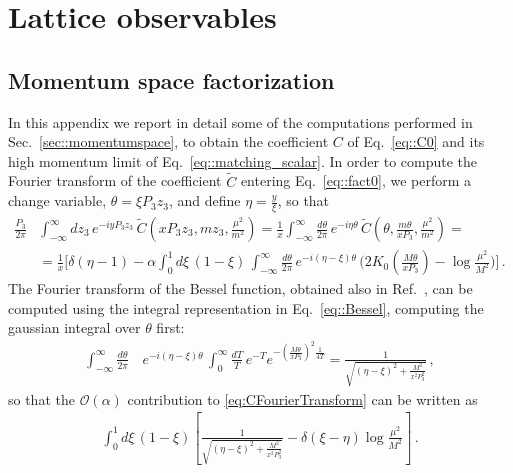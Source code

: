 \chapter{Lattice observables}
\label{app:scalar_lattice}
\section{Momentum space factorization}
\label{app:plus}

In this appendix we report in detail some of the computations performed in
Sec.~\ref{sec::momentumspace}, to obtain the coefficient $C$ of
Eq.~\eqref{eq::C0} and its high momentum limit of Eq.~\eqref{eq::matching_scalar}. In
order to compute the Fourier transform of the coefficient $\tilde{C}$ entering
Eq.~\eqref{eq::fact0}, we perform a change variable, $\theta = \xi P_3 z_3 $,
and define $\eta = \frac{y}{\xi}$, so that
\begin{align}
    \frac{P_3}{2\pi} 
    & \int_{-\infty}^{\infty} dz_3\,
        e^{-i y P_3 z_3}\,
        \tilde{C}\left(x P_3 z_3, m z_3, \frac{\mu^2}{m^2} \right)
        = \frac{1}{x} \int_{-\infty}^{\infty} \frac{d\theta}{2\pi}\,
        e^{-i \eta \theta}\,
        \tilde{C}\left(\theta, \frac{m \theta}{x P_3}, \frac{\mu^2}{m^2} \right)
        = \nonumber\\
    \label{eq:CFourierTransform}
    &= \frac{1}{x} \biggl[
        \delta\left(\eta-1\right) - \alpha \int_0^1 d\xi\, \left(1-\xi\right)\,
        \int_{-\infty}^{\infty} \frac{d\theta}{2\pi}\, 
        e^{-i \left(\eta-\xi\right) \theta} \,
        \biggl(2 K_0\left(\frac{M\theta}{x P_3}\right)
        -\log\frac{\mu^2}{M^2}\biggr)\biggr]\, .
\end{align}
The Fourier transform of the Bessel function, obtained also in Ref.~\cite{Radyushkin:2016hsy}, can be computed using the integral
representation in Eq.~\eqref{eq::Bessel}, computing the gaussian integral over
$\theta$ first:
\begin{align}
    \int_{-\infty}^{\infty} \frac{d\theta}{2\pi}\,
    & e^{-i \left(\eta-\xi\right)\theta}\,
    \int_0^{\infty} \frac{dT}{T}\, e^{-T} 
    e^{-\left(\frac{M\theta}{x P_3}\right)^2 \frac{1}{4T}} 
    =  \frac{1}{\sqrt{\left(\eta - \xi\right)^2 + \frac{M^2}{x^2 P_3^2}}}\, ,
\end{align}
so that the $\mathcal{O}(\alpha)$ contribution to \eqref{eq:CFourierTransform}
can be written as 
\begin{align}
    \label{eq::appC0}
    \int_0^1 d\xi\,
    \left(1-\xi\right) 
    \left[ \frac{1}{\sqrt{\left(\eta-\xi\right)^2 + \frac{M^2}{x^2P_3^2}}} 
    - \delta\left(\xi-\eta\right) \log\frac{\mu^2}{M^2}\right]\, .
\end{align}
